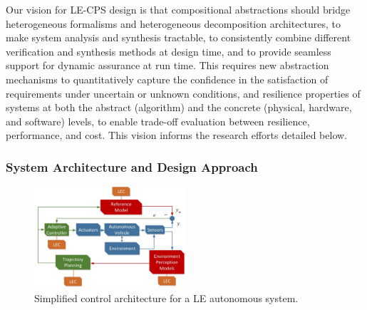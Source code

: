 Our vision for LE-CPS design is that compositional abstractions should bridge heterogeneous formalisms and heterogeneous decomposition architectures, to make system analysis and synthesis tractable, to consistently combine different verification and synthesis methods at design time, and to provide seamless support for dynamic assurance at run time. This requires new abstraction mechanisms to quantitatively capture the confidence in the satisfaction of requirements under uncertain or unknown conditions, and resilience properties of  systems at both the abstract (algorithm) and the concrete (physical, hardware, and software) levels, to enable trade-off evaluation between resilience, performance, and cost. This vision informs the research efforts detailed below. 



\vspace{-.2in}\subsubsection{System Architecture and Design Approach}
\vspace{-.1in}


\begin{figure}
\vspace{-30pt}
\begin{center}
\includegraphics[width=0.5\textwidth,trim={0in 0.15in 0in 0in},clip]{./TA1/Architecture.pdf}
\caption{Simplified control architecture for a LE autonomous system.}
\label{fig:architecture}
\end{center}
\vspace{-25pt}
\end{figure}


